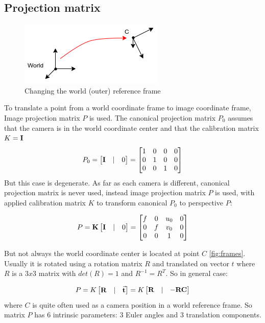 \subsection{Projection matrix}
\label{projection_matrix}
\begin{figure}[h]
    \centering
    \includegraphics[width=.5\textwidth]{graphics/frames.png}
    \caption{Changing the world (outer) reference frame}
    \label{fig:frames}
\end{figure}
To translate a point from a world coordinate frame to image coordinate frame, Image projection matrix $P$ is used. 
The canonical projection matrix $P_0$ assumes that the camera is in the world coordinate center and that the calibration matrix $K = \bf{I}$
$$
P_0 = \begin{bmatrix} \bf{I} & | & 0 \end{bmatrix} = 
    \begin{bmatrix}
    1 & 0 & 0 & 0 \\
    0 & 1 & 0 & 0 \\
    0 & 0 & 1 & 0 \\
    \end{bmatrix}
$$
But this case is degenerate. 
As far as each camera is different, canonical projection matrix is never used, instead image projection matrix $P$ is used, with applied calibration matrix $K$ to transform canonical $P_0$ to perspective $P$:

$$
P = \bf{K} \begin{bmatrix} \bf{I} & | & 0 \end{bmatrix} = 
    \begin{bmatrix} 
    f & 0 & u_0 & 0 \\
    0 & f & v_0 & 0 \\ 
    0 & 0 & 1 & 0 \\
    \end{bmatrix}
$$

But not always the world coordinate center is located at point $C$ \autoref{fig:frames}. 
Usually it is rotated using a rotation matrix $R$ and translated on vector $t$ where $R$ is a $3x3$ matrix with $det(R) = 1$ and $R^{-1} = R^T$. 
So in general case:

$$
P =   K \begin{bmatrix} \bf{R} & | & \vec{\bf{t}} \end{bmatrix} = 
        K \begin{bmatrix} \bf{R} & | & - \bf{R} \bf{C} \end{bmatrix}
$$
where $C$ is quite often used as a camera position in a world reference frame. 
So matrix $P$ has 6 intrinsic parameters: 3 Euler angles and 3 translation components. 


